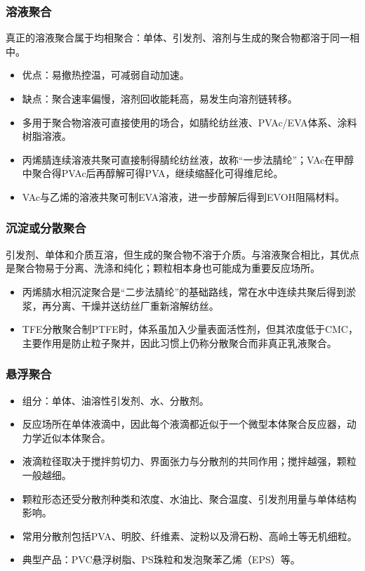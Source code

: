 ﻿\documentclass[12pt,a4paper]{article}
\begin{document}
\subsubsection{溶液聚合}
真正的溶液聚合属于均相聚合：单体、引发剂、溶剂与生成的聚合物都溶于同一相中。
\begin{itemize}
  \item 优点：易撤热控温，可减弱自动加速。
  \item 缺点：聚合速率偏慢，溶剂回收能耗高，易发生向溶剂链转移。
  \item 多用于聚合物溶液可直接使用的场合，如腈纶纺丝液、PVAc/EVA体系、涂料树脂溶液。
  \item 丙烯腈连续溶液共聚可直接制得腈纶纺丝液，故称“一步法腈纶”；VAc在甲醇中聚合得PVAc后再醇解可得PVA，继续缩醛化可得维尼纶。
  \item VAc与乙烯的溶液共聚可制EVA溶液，进一步醇解后得到EVOH阻隔材料。
\end{itemize}

\subsubsection{沉淀或分散聚合}
引发剂、单体和介质互溶，但生成的聚合物不溶于介质。与溶液聚合相比，其优点是聚合物易于分离、洗涤和纯化；颗粒相本身也可能成为重要反应场所。
\begin{itemize}
  \item 丙烯腈水相沉淀聚合是“二步法腈纶”的基础路线，常在水中连续共聚后得到淤浆，再分离、干燥并送纺丝厂重新溶解纺丝。
  \item TFE分散聚合制PTFE时，体系虽加入少量表面活性剂，但其浓度低于CMC，主要作用是防止粒子聚并，因此习惯上仍称分散聚合而非真正乳液聚合。
\end{itemize}

\subsubsection{悬浮聚合}
\begin{itemize}
  \item 组分：单体、油溶性引发剂、水、分散剂。
  \item 反应场所在单体液滴中，因此每个液滴都近似于一个微型本体聚合反应器，动力学近似本体聚合。
  \item 液滴粒径取决于搅拌剪切力、界面张力与分散剂的共同作用；搅拌越强，颗粒一般越细。
  \item 颗粒形态还受分散剂种类和浓度、水油比、聚合温度、引发剂用量与单体结构影响。
  \item 常用分散剂包括PVA、明胶、纤维素、淀粉以及滑石粉、高岭土等无机细粒。
  \item 典型产品：PVC悬浮树脂、PS珠粒和发泡聚苯乙烯（EPS）等。
\end{itemize}
\end{document}
